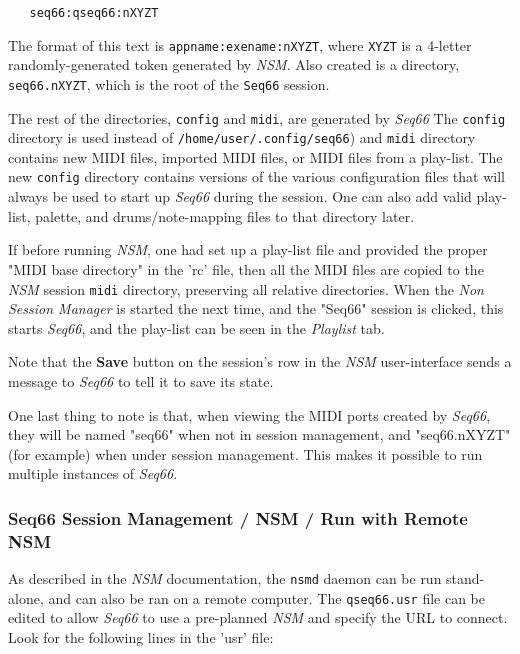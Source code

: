 \begin{verbatim}
   seq66:qseq66:nXYZT
\end{verbatim}

   The format of this text is \texttt{appname:exename:nXYZT}, where
   \texttt{XYZT} is a 4-letter randomly-generated token
   generated by \textsl{NSM}.
   Also created is a directory, \texttt{seq66.nXYZT}, which is the root of the
   \texttt{Seq66} session.

   The rest of the directories,
   \texttt{config} and \texttt{midi},
   are generated by \textsl{Seq66}
   The \texttt{config} directory is used instead of
   \texttt{/home/user/.config/seq66}) and \texttt{midi} directory
   contains new MIDI files, imported MIDI files,
   or MIDI files from a play-list.
   The new \texttt{config} directory
   contains versions of the various configuration files that will always be
   used to start up \textsl{Seq66} during the session.
   One can also add valid play-list, palette, and drums/note-mapping files to
   that directory later.

   If before running \textsl{NSM},
   one had set up a play-list file and provided the proper "MIDI
   base directory" in the 'rc' file, then all the MIDI files are copied to
   the \textsl{NSM} session \texttt{midi} directory,
   preserving all relative directories.
   When the \textsl{Non Session Manager} is started the next time, and the
   "Seq66" session is clicked, this starts \textsl{Seq66}, and the play-list can
   be seen in the \textsl{Playlist} tab.

   Note that the \textbf{Save} button on the session's row in the
   \textsl{NSM} user-interface sends a message to \textsl{Seq66}
   to tell it to save its state.

   One last thing to note is that, when viewing the MIDI ports created by
   \textsl{Seq66}, they will be named "seq66" when not in session management,
   and "seq66.nXYZT" (for example) when under session management.  This makes
   it possible to run multiple instances of \textsl{Seq66}.

\subsubsection{Seq66 Session Management / NSM / Run with Remote NSM}
\label{subsec:sessions_nsm_before_using_nsm}

   As described in the \textsl{NSM} documentation, the \texttt{nsmd} daemon can
   be run stand-alone, and can also be ran on a remote computer.
   The \texttt{qseq66.usr} file can be edited to allow \textsl{Seq66} to
   use a pre-planned \textsl{NSM} and specify the URL to connect.
   Look for the following lines in the 'usr' file:

